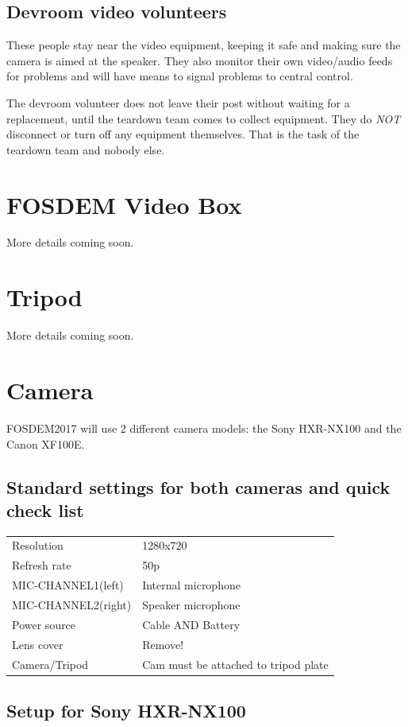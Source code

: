 \documentclass{article}
\begin{document}
\subsection{Devroom video volunteers}
These people stay near the video equipment, keeping it safe and making sure the camera is aimed at the speaker.
They also monitor their own video/audio feeds for problems and will have means to signal problems to central control.

The devroom volunteer does not leave their post without waiting for a replacement, until the teardown team comes to collect equipment. They do \emph{NOT} disconnect or turn off any equipment themselves. That is the task of the teardown team and nobody else.

\section{FOSDEM Video Box}
More details coming soon.

\section{Tripod}
More details coming soon.

\section{Camera}
FOSDEM2017 will use 2 different camera models: the Sony HXR-NX100 and the Canon XF100E.

\subsection{Standard settings for both cameras and quick check list}
\begin{tabular}{| l | l |}
Resolution & 1280x720 \\
Refresh rate & 50p \\
MIC-CHANNEL1(left) & Internal microphone \\
MIC-CHANNEL2(right) & Speaker microphone \\
Power source & Cable AND Battery \\
Lens cover & Remove! \\
Camera/Tripod & Cam must be attached to tripod plate \\
\end{tabular}

\subsection{Setup for Sony HXR-NX100}
\end{document}
